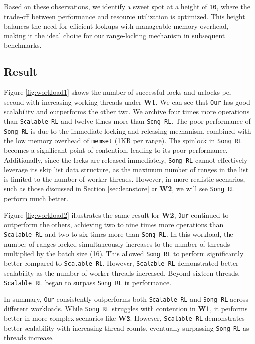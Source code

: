 Based on these observations, we identify a sweet spot at a height of \texttt{10}, where the trade-off between performance and resource utilization is optimized. 
This height balances the need for efficient lookups with manageable memory overhead, making it the ideal choice for our range-locking mechanism in subsequent benchmarks.

\subsection{Result}

Figure \ref{fig:workload1} shows the number of successful locks and unlocks per second with increasing working threads under \textbf{W1}. We can see that \texttt{Our} has good scalability and outperforms the other two. We archive four times more operations than \texttt{Scalable RL} and twelve times more than \texttt{Song RL}. The poor performance of \texttt{Song RL} is due to the immediate locking and releasing mechanism, combined with the low memory overhead of \texttt{memset} (1KB per range). The spinlock in \texttt{Song RL} becomes a significant point of contention, leading to its poor performance. Additionally, since the locks are released immediately, \texttt{Song RL} cannot effectively leverage its skip list data structure, as the maximum number of ranges in the list is limited to the number of worker threads. However, in more realistic scenarios, such as those discussed in Section \ref{sec:leanstore} or \textbf{W2}, we will see \texttt{Song RL} perform much better.

Figure \ref{fig:workload2} illustrates the same result for \textbf{W2}, \texttt{Our} continued to outperform the others, achieving two to nine times more operations than \texttt{Scalable RL} and two to six times more than \texttt{Song RL}. 
In this workload, the number of ranges locked simultaneously increases to the number of threads multiplied by the batch size (16). 
This allowed \texttt{Song RL} to perform significantly better compared to \texttt{Scalable RL}. 
However, \texttt{Scalable RL} demonstrated better scalability as the number of worker threads increased. Beyond sixteen threads, \texttt{Scalable RL} began to surpass \texttt{Song RL} in performance.

In summary, \texttt{Our} consistently outperforms both \texttt{Scalable RL} and \texttt{Song RL} across different workloads. 
While \texttt{Song RL} struggles with contention in \textbf{W1}, it performs better in more complex scenarios like \textbf{W2}. 
However, \texttt{Scalable RL} demonstrates better scalability with increasing thread counts, eventually surpassing \texttt{Song RL} as threads increase.

